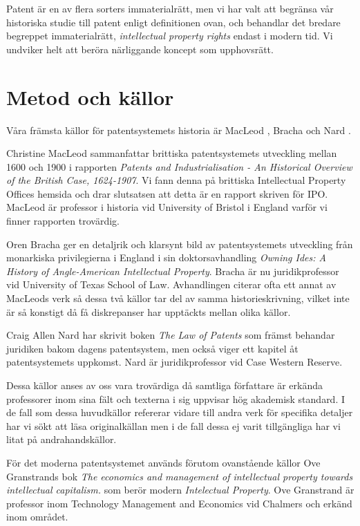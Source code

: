Patent är en av flera sorters immaterialrätt, men vi har valt att begränsa vår historiska studie till patent enligt definitionen ovan, och behandlar det bredare begreppet immaterialrätt, \emph{intellectual property rights} endast i modern tid.
Vi undviker helt att beröra närliggande koncept som upphovsrätt.

\section{Metod och källor}

Våra främsta källor för patentsystemets historia är MacLeod \cite{macleod},
Bracha \cite{bracha} och Nard \cite{nard}.

Christine MacLeod sammanfattar brittiska patentsystemets utveckling mellan 
1600 och 1900 i rapporten \emph{Patents and Industrialisation - An Historical 
Overview of the British Case, 1624-1907}. Vi fann denna på brittiska 
Intellectual Property Offices hemsida och drar slutsatsen att detta är en 
rapport skriven för IPO. MacLeod är professor i historia vid University of 
Bristol i England varför vi finner rapporten trovärdig.

Oren Bracha ger en detaljrik och klarsynt bild av patentsystemets utveckling 
från monarkiska privilegierna i England i sin doktorsavhandling \emph{Owning 
Ides: A History of Angle-American Intellectual Property}. Bracha är nu 
juridikprofessor vid University of Texas School of Law. Avhandlingen citerar 
ofta ett annat av MacLeods verk så dessa två källor tar del av samma 
historieskrivning, vilket inte är så konstigt då få diskrepanser har upptäckts 
mellan olika källor.

Craig Allen Nard har skrivit boken \emph{The Law of Patents} som främst 
behandar juridiken bakom dagens patentsystem, men också viger ett kapitel åt 
patentsystemets uppkomst. Nard är juridikprofessor vid Case Western Reserve.

Dessa källor anses av oss vara trovärdiga då samtliga författare är erkända 
professorer inom sina fält och texterna i sig uppvisar hög akademisk standard. 
I de fall som dessa huvudkällor refererar vidare till andra verk för 
specifika detaljer har vi sökt att läsa originalkällan men i de fall dessa ej 
varit tillgängliga har vi litat på andrahandskällor.

För det moderna patentsystemet används förutom ovanstående källor Ove Granstrands bok
\emph{The economics and management of intellectual property towards intellectual capitalism.}
som berör modern \emph{Intelectual Property}. Ove Granstrand är professor inom
Technology Management and Economics vid Chalmers och erkänd inom området.

